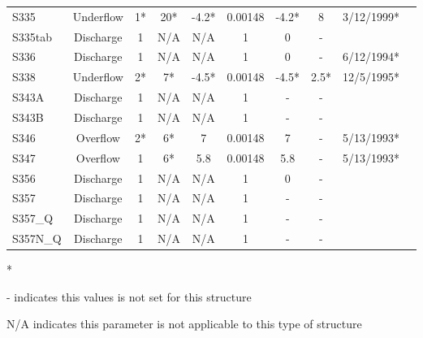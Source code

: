 \begin{table}[h]
\begin{tabular}{@{}lccccccccc@{}}
{S335}          & Underflow     & 1*       & 20*         & -4.2*        & 0.00148     & -4.2*           & 8       & 3/12/1999*  \\
{S335tab}       & Discharge     & 1        & N/A         & N/A          & 1           &  0              & -       &             \\
{S336}          & Discharge     & 1        & N/A         & N/A          & 1           &  0              & -       & 6/12/1994*  \\
{S338}          & Underflow     & 2*       & 7*          & -4.5*        & 0.00148     &  -4.5*          & 2.5*    & 12/5/1995*  \\
{S343A}         & Discharge     & 1        & N/A         & N/A          & 1           &  -              & -       &             \\
{S343B}         & Discharge     & 1        & N/A         & N/A          & 1           &  -              & -       &             \\
{S346}          & Overflow      & 2*       & 6*          & 7            & 0.00148     &  7              & -       & 5/13/1993*  \\
{S347}          & Overflow      & 1        & 6*          & 5.8          & 0.00148     &  5.8            & -       & 5/13/1993*  \\
{S356}          & Discharge     & 1        & N/A         & N/A          & 1           &  0              & -       &             \\
{S357}          & Discharge     & 1        & N/A         & N/A          & 1           &  -              & -       &             \\
{S357\_Q}       & Discharge     & 1        & N/A         & N/A          & 1           &  -              & -       &             \\
{S357N\_Q}      & Discharge     & 1        & N/A         & N/A          & 1           &  -              & -       &             \\
\hline
\end{tabular}

* \cite{corp2005}

- indicates this values is not set for this structure

N/A indicates this parameter is not applicable to this type of structure
\end{table}
\normalsize

